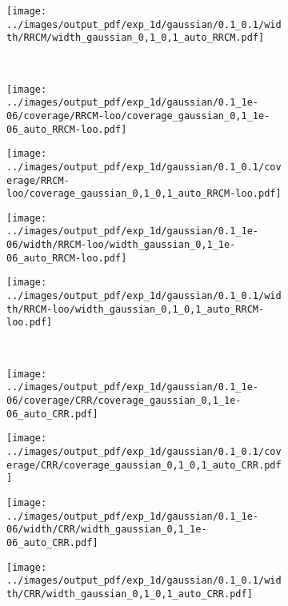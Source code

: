\documentclass[10pt, conference, compsocconf]{IEEEtran}
\begin{document}
\begin{figure}
\begin{subfigure}[b]{0.25\linewidth}
  \end{subfigure}%
  \begin{subfigure}[b]{0.25\linewidth}
    \texttt{[image: ../images/output\_pdf/exp\_1d/gaussian/0.1\_0.1/width/RRCM/width\_gaussian\_0,1\_0,1\_auto\_RRCM.pdf]}
  \end{subfigure}\\
  \begin{subfigure}[b]{0.25\linewidth}
    \texttt{[image: ../images/output\_pdf/exp\_1d/gaussian/0.1\_1e-06/coverage/RRCM-loo/coverage\_gaussian\_0,1\_1e-06\_auto\_RRCM-loo.pdf]}
  \end{subfigure}%
  \begin{subfigure}[b]{0.25\linewidth}
    \texttt{[image: ../images/output\_pdf/exp\_1d/gaussian/0.1\_0.1/coverage/RRCM-loo/coverage\_gaussian\_0,1\_0,1\_auto\_RRCM-loo.pdf]}
  \end{subfigure}%
  \begin{subfigure}[b]{0.25\linewidth}
    \texttt{[image: ../images/output\_pdf/exp\_1d/gaussian/0.1\_1e-06/width/RRCM-loo/width\_gaussian\_0,1\_1e-06\_auto\_RRCM-loo.pdf]}
  \end{subfigure}%
  \begin{subfigure}[b]{0.25\linewidth}
    \texttt{[image: ../images/output\_pdf/exp\_1d/gaussian/0.1\_0.1/width/RRCM-loo/width\_gaussian\_0,1\_0,1\_auto\_RRCM-loo.pdf]}
  \end{subfigure}\\
  \begin{subfigure}[b]{0.25\linewidth}
    \texttt{[image: ../images/output\_pdf/exp\_1d/gaussian/0.1\_1e-06/coverage/CRR/coverage\_gaussian\_0,1\_1e-06\_auto\_CRR.pdf]}
  \end{subfigure}%
  \begin{subfigure}[b]{0.25\linewidth}
    \texttt{[image: ../images/output\_pdf/exp\_1d/gaussian/0.1\_0.1/coverage/CRR/coverage\_gaussian\_0,1\_0,1\_auto\_CRR.pdf]}
  \end{subfigure}%
  \begin{subfigure}[b]{0.25\linewidth}
    \texttt{[image: ../images/output\_pdf/exp\_1d/gaussian/0.1\_1e-06/width/CRR/width\_gaussian\_0,1\_1e-06\_auto\_CRR.pdf]}
  \end{subfigure}%
  \begin{subfigure}[b]{0.25\linewidth}
    \texttt{[image: ../images/output\_pdf/exp\_1d/gaussian/0.1\_0.1/width/CRR/width\_gaussian\_0,1\_0,1\_auto\_CRR.pdf]}

\end{subfigure}
\end{figure}
\end{document}
